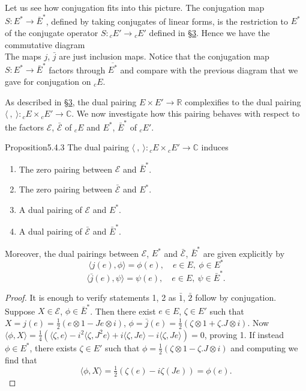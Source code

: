 Let us see how conjugation fits into this picture. The conjugation map $S:E^*\to\bar E^*$, defined by taking conjugates of linear forms, is the restriction to $E^*$ of the conjugate operator $S:{}_cE'\to{}_cE'$ defined in \hyperref[sec:5:3]{\S3}. Hence we have the commutative diagram
\[

\]
The maps $j$, $\bar j$ are just inclusion maps. Notice that the conjugation map $S:E^*\to\bar E^*$ factors through $\overline{E^*}$ and compare with the previous diagram that we gave for conjugation on ${}_cE$.

As described in \hyperref[sec:5:3]{\S3}, the dual pairing $E\times E'\to\mathbb R$ complexifies to the dual pairing $\langle\ ,\ \rangle:{}_cE\times{}_cE'\to\mathbb C$. We now investigate how this pairing behaves with respect to the factors $\mathcal E$, $\bar{\mathcal E}$ of ${}_cE$ and $E^*$, $\bar E^*$ of ${}_cE'$.
\begin{originaltheorem}{Proposition}{5.4.3}
The dual pairing $\langle\ ,\ \rangle:{}_cE\times{}_cE'\to\mathbb C$ induces
\begin{enumerate}
\item[1.] The zero pairing between $\mathcal E$ and $\bar E^*$.
\item[$\bar1$.] The zero pairing between $\bar{\mathcal E}$ and $E^*$.
\item[2.] A dual pairing of $\mathcal E$ and $E^*$.
\item[$\bar2$.] A dual pairing of $\bar{\mathcal E}$ and $\bar E^*$.
\end{enumerate}
Moreover, the dual pairings between $\mathcal E$, $E^*$ and $\bar{\mathcal E}$, $\bar E^*$ are given explicitly by
\[
\langle j(e),\phi\rangle=\phi(e),\quad e\in E,\ \phi\in E^*
\]
\[
\langle\bar j(e),\psi\rangle=\psi(e),\quad e\in E,\ \psi\in\bar E^*.
\]
\end{originaltheorem}
\begin{proof}
It is enough to verify statements 1, 2 as $\bar1$, $\bar2$ follow by conjugation. Suppose $X\in\mathcal E$, $\phi\in\bar E^*$. Then there exist $e\in E$, $\zeta\in E'$ such that $X=j(e)=\tfrac12(e\otimes1-Je\otimes i)$, $\phi=\bar j(e)=\tfrac12(\zeta\otimes1+\zeta.J\otimes i)$. Now $\langle\phi,X\rangle=\tfrac14(\langle\zeta,e\rangle-i^2\langle\zeta,J^2e\rangle+i\langle\zeta,Je\rangle-i\langle\zeta,Je\rangle)=0$, proving 1. If instead $\phi\in E^*$, there exists $\zeta\in E'$ such that $\phi=\tfrac12(\zeta\otimes1-\zeta.J\otimes i)$ and computing we find that
\[
\langle\phi,X\rangle=\tfrac12(\zeta(e)-i\zeta(Je))=\phi(e).
\]
\end{proof}
